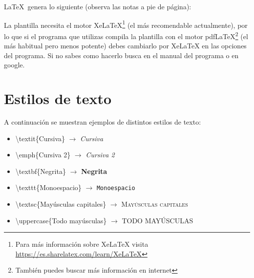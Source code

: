 \LaTeX~genera lo siguiente (observa las notas a pie de página):
\\
\par La plantilla necesita el motor XeLaTeX\footnote{Para más información sobre XeLaTeX visita \url{https://es.sharelatex.com/learn/XeLaTeX}} (el más recomendable actualmente), por lo que si el programa que utilizas compila la plantilla con el motor pdfLaTeX\footnote{También puedes buscar más información en internet} (el más habitual pero menos potente) debes cambiarlo por XeLaTeX en las opciones del programa. Si no sabes como hacerlo busca en el manual del programa o en google.
\section{Estilos de texto}

A continuación se muestran ejemplos de distintos estilos de texto:

\begin{itemize}
	\item \textbackslash textit\{Cursiva\} $\rightarrow$ \textit{Cursiva}
	\item \textbackslash emph\{Cursiva 2\} $\rightarrow$ \emph{Cursiva 2}
	\item \textbackslash textbf\{Negrita\} $\rightarrow$ \textbf{Negrita}
	\item \textbackslash texttt\{Monoespacio\} $\rightarrow$ \texttt{Monoespacio}
	\item \textbackslash textsc\{Mayúsculas capitales\} $\rightarrow$ \textsc{Mayúsculas capitales}
	\item \textbackslash uppercase\{Todo mayúsculas\} $\rightarrow$ \uppercase{Todo mayúsculas} 
\end{itemize}
